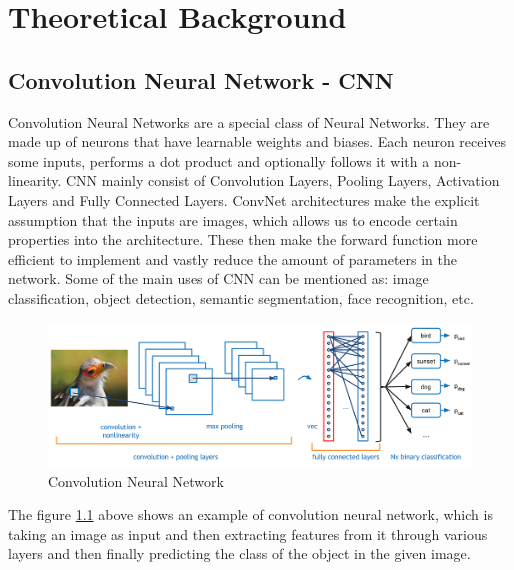\chapter{Theoretical Background}

  \section{ Convolution Neural Network - CNN }
    Convolution Neural Networks are a special class of Neural Networks. They are made up 
    of neurons that have learnable weights and biases. Each neuron receives some inputs, 
    performs a dot product and optionally follows it with a non-linearity. CNN mainly consist
    of Convolution Layers, Pooling Layers, Activation Layers and Fully Connected Layers.
    ConvNet architectures make the explicit assumption that the inputs are images, 
    which allows us to encode certain properties into the architecture. These then 
    make the forward function more efficient to implement and vastly reduce the amount 
    of parameters in the network. Some of the main uses of CNN can be mentioned as: image
    classification, object detection, semantic segmentation, face recognition, etc.
    
    \begin{figure}[H]
      \centering
      \includegraphics[width=\textwidth]{img/Chap3/Cover.png}
      \caption{Convolution Neural Network}
      \label{fig:Chap3-OverviewTheCNN}
    \end{figure}
      The figure \ref{fig:Chap3-OverviewTheCNN} above shows an example of convolution neural network, which is taking an image 
    as input and then extracting features from it through various layers and then finally predicting the
    class of the object in the given image.

